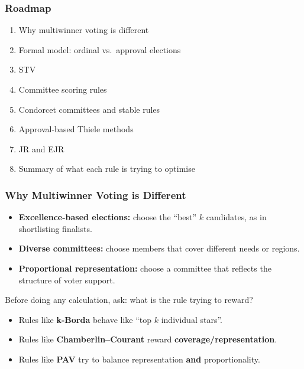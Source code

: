 \subsubsection*{Roadmap}
\begin{enumerate}
  \item Why multiwinner voting is different
  \item Formal model: ordinal vs.\ approval elections
  \item STV
  \item Committee scoring rules
  \item Condorcet committees and stable rules
  \item Approval-based Thiele methods
  \item JR and EJR
  \item Summary of what each rule is trying to optimise
\end{enumerate}

\bigseparator

\subsubsection{Why Multiwinner Voting is Different}

\begin{defbox}
\begin{itemize}
  \item \textbf{Excellence-based elections:} choose the ``best'' $k$ candidates, as in shortlisting finalists.
  \item \textbf{Diverse committees:} choose members that cover different needs or regions.
  \item \textbf{Proportional representation:} choose a committee that reflects the structure of voter support.
\end{itemize}
\end{defbox}

\begin{tipbox}
Before doing any calculation, ask: what is the rule trying to reward?
\begin{itemize}
  \item Rules like \textbf{k-Borda} behave like ``top $k$ individual stars''.
  \item Rules like \textbf{Chamberlin--Courant} reward \textbf{coverage/representation}.
  \item Rules like \textbf{PAV} try to balance representation \textbf{and} proportionality.
\end{itemize}
\end{tipbox}

